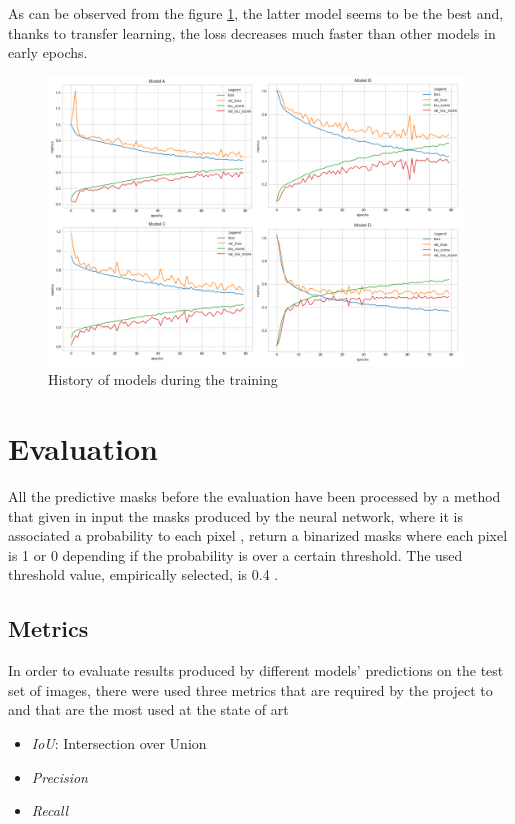 \documentclass[a4paper,10pt]{report}
\begin{document}
As can be observed from the figure \ref{fig:plot}, the latter model seems to be the best and, thanks to transfer learning, the loss decreases much faster than other models in early epochs.

\begin{figure}[h]
    \centering
    \includegraphics[width=0.98\textwidth]{assets/img/plots.png}
    \caption{History of models during the training}
    \label{fig:plot}
\end{figure}




\chapter{Evaluation}\label{chap:chapter-5}

All the predictive masks before the evaluation have been processed by a method that given in input the masks produced by the neural network, where it is associated a probability to each pixel , return a binarized masks where each pixel is 1 or 0 depending if the probability is over a certain threshold. The used threshold value, empirically selected, is 0.4 .

\section{Metrics}\label{sec:section-51}
In order to evaluate results produced by different models' predictions on the test set of images, there were used three metrics that are required by the project to and that are the most used at the state of art \cite{metrics}
\begin{itemize}
    \item \emph{IoU}: Intersection over Union
    \item \emph{Precision}
    \item \emph{Recall}
\end{itemize}
\end{document}
